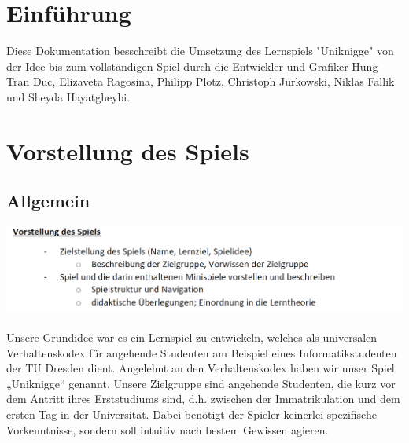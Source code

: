 \documentclass[a4paper, 11pt]{article} %
\begin{document}

\newpage
\renewcommand{\contentsname}{Inhaltsverzeichnis}
\tableofcontents

\newpage
\section{Einführung}
Diese Dokumentation besschreibt die Umsetzung des Lernspiels "Uniknigge" von der Idee bis zum vollständigen Spiel durch die Entwickler und Grafiker Hung Tran Duc, Elizaveta Ragosina, Philipp Plotz, Christoph Jurkowski, Niklas Fallik und Sheyda Hayatgheybi.

\section{Vorstellung des Spiels}
\subsection{Allgemein}
\includegraphics[scale=0.5]{images/vorstellung.png}\\\\
Unsere Grundidee war es ein Lernspiel zu entwickeln, welches als universalen Verhaltenskodex für angehende Studenten am Beispiel eines Informatikstudenten der TU Dresden dient. Angelehnt an den Verhaltenskodex haben wir unser Spiel „Uniknigge“ genannt. Unsere Zielgruppe sind angehende Studenten, die kurz vor dem Antritt ihres Erststudiums sind, d.h. zwischen der Immatrikulation und dem ersten Tag in der Universität. Dabei benötigt der Spieler keinerlei spezifische Vorkenntnisse, sondern soll intuitiv nach bestem Gewissen agieren. \\
\end{document}
